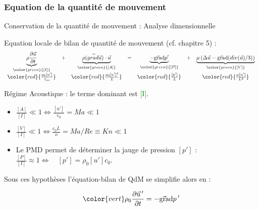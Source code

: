 \subsubsection{Equation de la quantité de mouvement}
\begin{frame}{Conservation de la quantité de mouvement : Analyse dimensionnelle}

\small

Equation locale de bilan de quantité de mouvement (cf. chapitre 5) :
\begin{equation}
\begin{array}{ccccccc}
\underbrace{\rho \dpdt{\myvec{u}}}_{\color{green}{[I]}} 
&+& 
\underbrace{\rho (\mytensor{grad} \myvec{u} ) \cdot \myvec{u}}_{\color{green}{[A]}} 
 &=&
\underbrace{ - \gradient p' }_{\color{green}{[P]}} 
 &+& 
 \underbrace{ \mu \left( \Delta \myvec{u} - \gradient (div(\myvec{u})/3)  \right)}_{\color{green}{[V]}} 
  \\
  \color{red}{\frac{\rho_0 [u']}{\tau_{ac}}}
  &&
   \color{red}{\frac{\rho_0 [u']^2}{L}}
&&
   \color{red}{\frac{[p']}{L}}
   &&
    \color{red}{\frac{\mu [u'] }{L^2}}
   \end{array}
\end{equation}

\pause

Régime Acoustique : le terme dominant est \textcolor{green}{[I]}.


\begin{itemize}
\item $\frac{[A]}{[I]}  \ll 1 \Longleftrightarrow \frac{[u']}{c_0} = Ma \ll 1$

\item $\frac{[V]}{[I]}  \ll 1 \Longleftrightarrow \frac{c_0 L}{\nu } = Ma / Re \equiv Kn \ll 1$

\item Le PMD permet de déterminer la jauge de pression $[p']$  : 
$\frac{[P]}{[I]}  \approx 1 \Longleftrightarrow \quad [p'] = \rho_0 [u'] c_0 $.
\end{itemize}


Sous ces hypothèses l'équation-bilan de QdM se simplifie alors en :

$$
\color{vert}
\rho_0 \dpdt{\myvec{u}\myprime} = - \gradient p \myprime
$$

\end{frame}



